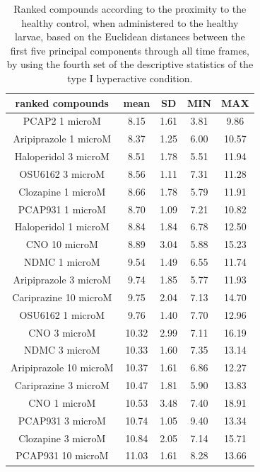 \begin{table}[h!]\tiny
\centering
\caption{Ranked compounds according to the proximity to the healthy control, when administered to the healthy larvae, based on the Euclidean distances between the first five principal components through all time frames, by using the fourth set of the descriptive statistics of the type I hyperactive condition.}
\begin{tabular}{|c|c|c|c|c|}
\hline
ranked compounds             & mean & SD   & MIN  & MAX   \\ \hline
PCAP2 1 microM         & 8.15  & 1.61 & 3.81  & 9.86  \\ \hline
Aripiprazole 1 microM  & 8.37  & 1.25 & 6.00     & 10.57 \\ \hline
Haloperidol 3 microM   & 8.51  & 1.78 & 5.51  & 11.94 \\ \hline
OSU6162 3 microM       & 8.56  & 1.11 & 7.31  & 11.28 \\ \hline
Clozapine 1 microM     & 8.66  & 1.78 & 5.79  & 11.91 \\ \hline
PCAP931 1 microM       & 8.70   & 1.09 & 7.21  & 10.82 \\ \hline
Haloperidol 1 microM   & 8.84  & 1.84 & 6.78  & 12.50  \\ \hline
CNO 10 microM          & 8.89  & 3.04 & 5.88  & 15.23 \\ \hline
NDMC 1 microM          & 9.54  & 1.49 & 6.55  & 11.74 \\ \hline
Aripiprazole 3 microM  & 9.74  & 1.85 & 5.77  & 11.93 \\ \hline
Cariprazine 10 microM  & 9.75  & 2.04 & 7.13  & 14.70  \\ \hline
OSU6162 1 microM       & 9.76  & 1.40  & 7.70   & 12.96 \\ \hline
CNO 3 microM           & 10.32 & 2.99 & 7.11  & 16.19 \\ \hline
NDMC 3 microM          & 10.33 & 1.60  & 7.35  & 13.14 \\ \hline
Aripiprazole 10 microM & 10.37 & 1.61 & 6.86  & 12.27 \\ \hline
Cariprazine 3 microM   & 10.47 & 1.81 & 5.90   & 13.83 \\ \hline
CNO 1 microM           & 10.53 & 3.48 & 7.40   & 18.91 \\ \hline
PCAP931 3 microM       & 10.74 & 1.05 & 9.40   & 13.34 \\ \hline
Clozapine 3 microM     & 10.84 & 2.05 & 7.14  & 15.71 \\ \hline
PCAP931 10 microM      & 11.03 & 1.61 & 8.28  & 13.66 \\ \hline

\end{tabular}
\end{table}
